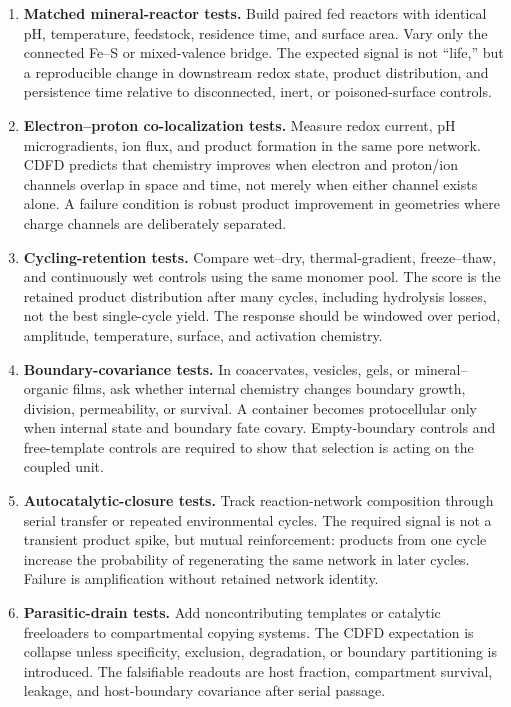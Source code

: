 \documentclass[11pt,a4paper]{article}
\begin{document}
\begin{enumerate}
 \item \textbf{Matched mineral-reactor tests.} Build paired fed reactors with identical pH, temperature, feedstock, residence time, and surface area. Vary only the connected Fe--S or mixed-valence bridge. The expected signal is not ``life,'' but a reproducible change in downstream redox state, product distribution, and persistence time relative to disconnected, inert, or poisoned-surface controls.
 \item \textbf{Electron--proton co-localization tests.} Measure redox current, pH microgradients, ion flux, and product formation in the same pore network. CDFD predicts that chemistry improves when electron and proton/ion channels overlap in space and time, not merely when either channel exists alone. A failure condition is robust product improvement in geometries where charge channels are deliberately separated.
 \item \textbf{Cycling-retention tests.} Compare wet--dry, thermal-gradient, freeze--thaw, and continuously wet controls using the same monomer pool. The score is the retained product distribution after many cycles, including hydrolysis losses, not the best single-cycle yield. The response should be windowed over period, amplitude, temperature, surface, and activation chemistry.
 \item \textbf{Boundary-covariance tests.} In coacervates, vesicles, gels, or mineral--organic films, ask whether internal chemistry changes boundary growth, division, permeability, or survival. A container becomes protocellular only when internal state and boundary fate covary. Empty-boundary controls and free-template controls are required to show that selection is acting on the coupled unit.
 \item \textbf{Autocatalytic-closure tests.} Track reaction-network composition through serial transfer or repeated environmental cycles. The required signal is not a transient product spike, but mutual reinforcement: products from one cycle increase the probability of regenerating the same network in later cycles. Failure is amplification without retained network identity.
 \item \textbf{Parasitic-drain tests.} Add noncontributing templates or catalytic freeloaders to compartmental copying systems. The CDFD expectation is collapse unless specificity, exclusion, degradation, or boundary partitioning is introduced. The falsifiable readouts are host fraction, compartment survival, leakage, and host-boundary covariance after serial passage.

\end{enumerate}
\end{document}
